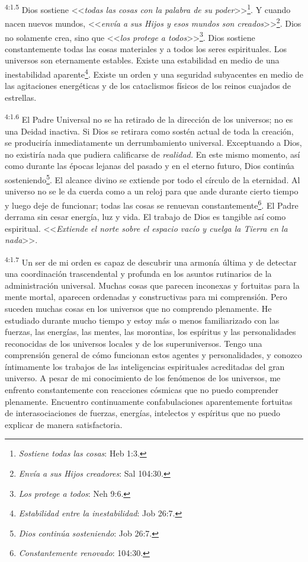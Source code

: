 \par
\textsuperscript{4:1.5} Dios sostiene <<\textit{todas las cosas con la palabra de su poder}>>\footnote{\textit{Sostiene todas las cosas}: Heb 1:3.}. Y cuando nacen nuevos mundos, <<\textit{envía a sus Hijos y esos mundos son creados}>>\footnote{\textit{Envía a sus Hijos creadores}: Sal 104:30.}. Dios no solamente crea, sino que <<\textit{los protege a todos}>>\footnote{\textit{Los protege a todos}: Neh 9:6.}. Dios sostiene constantemente todas las cosas materiales y a todos los seres espirituales. Los universos son eternamente estables. Existe una estabilidad en medio de una inestabilidad aparente\footnote{\textit{Estabilidad entre la inestabilidad}: Job 26:7.}. Existe un orden y una seguridad subyacentes en medio de las agitaciones energéticas y de los cataclismos físicos de los reinos cuajados de estrellas.

\par
\textsuperscript{4:1.6} El Padre Universal no se ha retirado de la dirección de los universos; no es una Deidad inactiva. Si Dios se retirara como sostén actual de toda la creación, se produciría inmediatamente un derrumbamiento universal. Exceptuando a Dios, no existiría nada que pudiera calificarse de \textit{realidad.} En este mismo momento, así como durante las épocas lejanas del pasado y en el eterno futuro, Dios continúa sosteniendo\footnote{\textit{Dios continúa sosteniendo}: Job 26:7.}. El alcance divino se extiende por todo el círculo de la eternidad. Al universo no se le da cuerda como a un reloj para que ande durante cierto tiempo y luego deje de funcionar; todas las cosas se renuevan constantemente\footnote{\textit{Constantemente renovado}: 104:30.}. El Padre derrama sin cesar energía, luz y vida. El trabajo de Dios es tangible así como espiritual. <<\textit{Extiende el norte sobre el espacio vacío y cuelga la Tierra en la nada}>>.

\par
\textsuperscript{4:1.7} Un ser de mi orden es capaz de descubrir una armonía última y de detectar una coordinación trascendental y profunda en los asuntos rutinarios de la administración universal. Muchas cosas que parecen inconexas y fortuitas para la mente mortal, aparecen ordenadas y constructivas para mi comprensión. Pero suceden muchas cosas en los universos que no comprendo plenamente. He estudiado durante mucho tiempo y estoy más o menos familiarizado con las fuerzas, las energías, las mentes, las morontias, los espíritus y las personalidades reconocidas de los universos locales y de los superuniversos. Tengo una comprensión general de cómo funcionan estos agentes y personalidades, y conozco íntimamente los trabajos de las inteligencias espirituales acreditadas del gran universo. A pesar de mi conocimiento de los fenómenos de los universos, me enfrento constantemente con reacciones cósmicas que no puedo comprender plenamente. Encuentro continuamente confabulaciones aparentemente fortuitas de interasociaciones de fuerzas, energías, intelectos y espíritus que no puedo explicar de manera satisfactoria.

